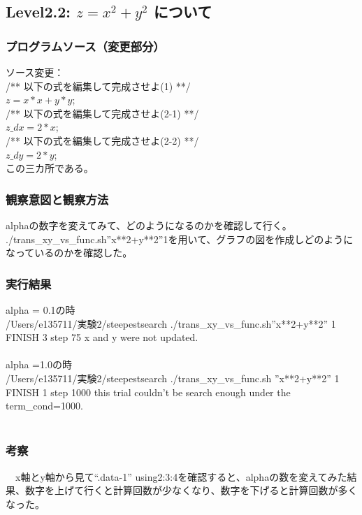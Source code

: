 \subsection{Level2.2: $z=x^2 + y^2$ について}
\subsubsection{プログラムソース（変更部分）}
ソース変更：\\
/** 以下の式を編集して完成させよ(1) **/\\
 $ z = x*x + y*y$;\\
/** 以下の式を編集して完成させよ(2-1) **/\\
$z\_dx = 2*x$;\\
/** 以下の式を編集して完成させよ(2-2) **/\\
$z\_dy = 2*y$;\\
この三カ所である。\\
\subsubsection{観察意図と観察方法}
alphaの数字を変えてみて、どのようになるのかを確認して行く。\\
./trans\_xy\_vs\_func.sh''x**2+y**2''1を用いて、グラフの図を作成しどのようになっているのかを確認した。\\
\subsubsection{実行結果}
alpha = 0.1の時\\
/Users/e135711/実験2/steepestsearch ./trans\_xy\_vs\_func.sh''x**2+y**2'' 1\\
FINISH 3 step 75 x and y were not updated.\\
\\
alpha =1.0の時\\
/Users/e135711/実験2/steepestsearch ./trans\_xy\_vs\_func.sh ''x**2+y**2'' 1\\
FINISH 1 step 1000 this trial couldn't be search enough under the term\_cond=1000.\\
\\
\subsubsection{考察}
　x軸とy軸から見て“.data-1” using2:3:4を確認すると、alphaの数を変えてみた結果、数字を上げて行くと計算回数が少なくなり、数字を下げると計算回数が多くなった。\\
